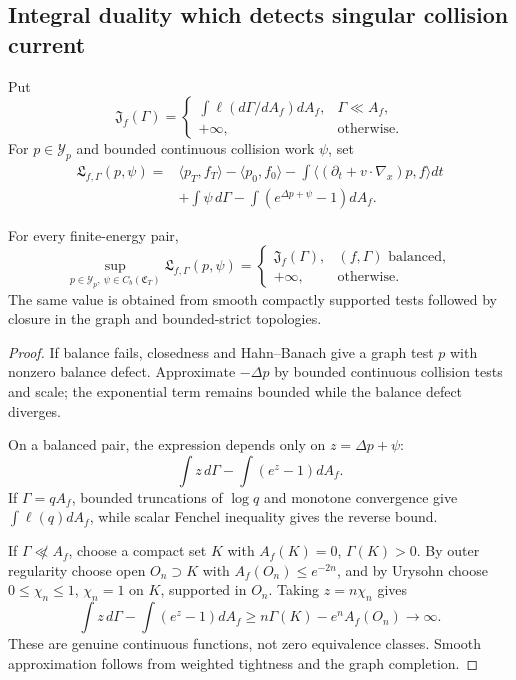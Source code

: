 \subsection{Integral duality which detects singular collision current}

Put
\[
 \mathfrak J_f(\Gamma)=
 \begin{cases}
 \displaystyle\int\ell(d\Gamma/dA_f)dA_f,&\Gamma\ll A_f,\\
 +\infty,&\text{otherwise}.
 \end{cases}
\]
For \(p\in\mathcal Y_p\) and bounded continuous collision work \(\psi\), set
\[
 \begin{aligned}
 \mathfrak L_{f,\Gamma}(p,\psi)
 ={}&\langle p_T,f_T\rangle-\langle p_0,f_0\rangle
 -\int\langle(\partial_t+v\cdot\nabla_x)p,f\rangle dt\\
 &+\int\psi\,d\Gamma
 -\int(e^{\Delta p+\psi}-1)dA_f.
 \end{aligned}
\]

\begin{theorem}
\label{thm:r3-b3-duality}
For every finite-energy pair,
\[
 \sup_{p\in\mathcal Y_p,\ \psi\in C_b(\mathfrak C_T)}
 \mathfrak L_{f,\Gamma}(p,\psi)
 =\begin{cases}
 \mathfrak J_f(\Gamma),&(f,\Gamma)\text{ balanced},\\
 +\infty,&\text{otherwise}.
 \end{cases}
\]
The same value is obtained from smooth compactly supported tests followed by
closure in the graph and bounded-strict topologies.
\end{theorem}

\begin{proof}
If balance fails, closedness and Hahn--Banach give a graph test \(p\) with
nonzero balance defect.  Approximate \(-\Delta p\) by bounded continuous
collision tests and scale; the exponential term remains bounded while the
balance defect diverges.

On a balanced pair, the expression depends only on
\(z=\Delta p+\psi\):
\[
 \int z\,d\Gamma-\int(e^z-1)dA_f.
\]
If \(\Gamma=qA_f\), bounded truncations of \(\log q\) and monotone convergence
give \(\int\ell(q)dA_f\), while scalar Fenchel inequality gives the reverse
bound.

If \(\Gamma\not\ll A_f\), choose a compact set \(K\) with
\(A_f(K)=0\), \(\Gamma(K)>0\).  By outer regularity choose open
\(O_n\supset K\) with \(A_f(O_n)\le e^{-2n}\), and by Urysohn choose
\(0\le\chi_n\le1\), \(\chi_n=1\) on \(K\), supported in \(O_n\).  Taking
\(z=n\chi_n\) gives
\[
 \int z\,d\Gamma-\int(e^z-1)dA_f
 \ge n\Gamma(K)-e^nA_f(O_n)\to\infty.
\]
These are genuine continuous functions, not zero equivalence classes.  Smooth
approximation follows from weighted tightness and the graph completion.
\end{proof}

